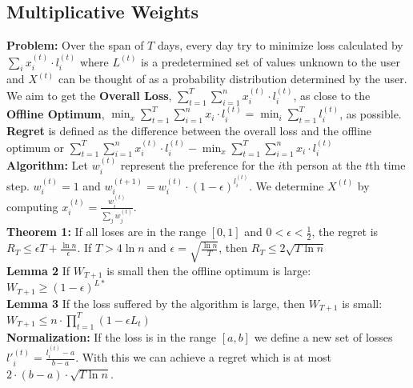 \documentclass{article}
\begin{document}
\begin{multicols}{2}
\section*{Multiplicative Weights}
\textbf{Problem: }Over the span of $T$ days, every day try to minimize loss calculated by $\sum_i x_i^{(t)} \cdot l_i^{(t)}$ where $L^{(t)}$ is a predetermined set of values unknown to the user and $X^{(t)}$ can be thought of as a probability distribution determined by the user. We aim to get the \textbf{Overall Loss}, $\sum_{t=1}^{T} \sum_{i=1}^{n} x_i^{(t)} \cdot l_i^{(t)}$, as close to the \textbf{Offline Optimum}, $\min_{x} \sum_{t=1}^{T} \sum_{i=1}^{n} x_i \cdot l_i^{(t)} = \min_i \sum_{t=1}^T l_i^{(t)}$, as possible. \textbf{Regret} is defined as the difference between the overall loss and the offline optimum or $\sum_{t=1}^{T} \sum_{i=1}^{n} x_i^{(t)} \cdot l_i^{(t)} - \min_{x} \sum_{t=1}^{T} \sum_{i=1}^{n} x_i \cdot l_i^{(t)}$\\
\textbf{Algorithm: }Let $w_i^{(t)}$ represent the preference for the $i$th person at the $t$th time step. $w_i^{(t)} = 1$ and $w_i^{(t+1)} = w_i^{(t)} \cdot (1 - \epsilon)^{l_i^{(t)}}$. We determine $X^{(t)}$ by computing $x_i^{(t)} = \frac{w_i^{(t)}}{\sum_j w_j^{(t)}}$. \\
\textbf{Theorem 1:} If all loses are in the range $[0, 1]$ and $0 < \epsilon < \frac{1}{2}$, the regret is $R_T \leq \epsilon T + \frac{\ln n}{\epsilon}$. If $T > 4 \ln n$ and $\epsilon = \sqrt{\frac{\ln n}{T}}$, then $R_T \leq 2 \sqrt{T \ln n}$ \\
\textbf{Lemma 2} If $W_{T+1}$ is small then the offline optimum is large: $W_{T+1} \geq
(1-\epsilon)^{L*}$ \\
\textbf{Lemma 3} If the loss suffered by the algorithm is large, then $W_{T+1}$ is small: $W_{T+1} \leq n \cdot \prod_{t=1}^{T}(1 - \epsilon L_t)$ \\
\textbf{Normalization: }If the loss is in the range $[a, b]$ we define a new set of losses $l'_i^{(t)} = \frac{l_i^{(t)} - a}{b-a}$. With this we can achieve a regret which is at most $2 \cdot (b-a) \cdot \sqrt{T \ln n}$. 


\end{multicols}
\end{document}
